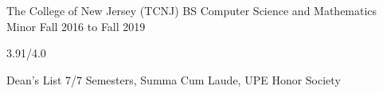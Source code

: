 
\begin{cventry}
    {The College of New Jersey (TCNJ)}
    {BS Computer Science and Mathematics Minor}
    {Fall 2016 to Fall 2019}{}
    \begin{cvitems}
        \item{} 3.91/4.0
        \item{} Dean's List 7/7 Semesters, Summa Cum Laude, UPE Honor Society
    \end{cvitems}
\end{cventry}
